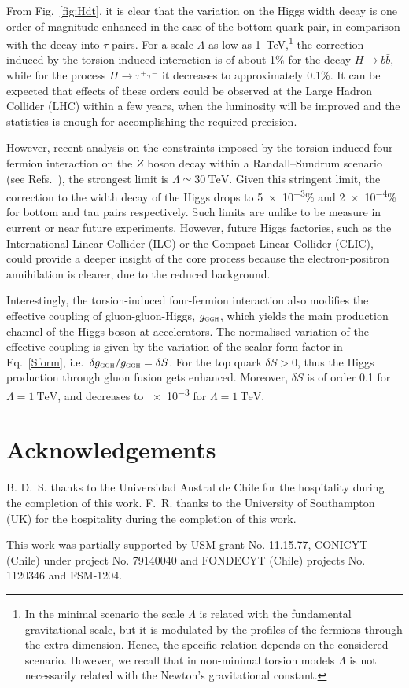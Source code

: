 \documentclass{ws-mpla}
\renewcommand{\(}{\left(}
\renewcommand{\)}{\right)}
\renewcommand{\[}{\left[}
\renewcommand{\]}{\right]}
\begin{document}
From Fig.~\ref{fig:Hdt}, it is clear that the variation on the Higgs width decay is one order of magnitude enhanced in the case of the bottom quark pair, in comparison with the decay into $\tau$ pairs. For a scale $\Lambda$ as low as \SI{1}{\TeV},\footnote{In the minimal scenario the scale $\Lambda$ is related with the fundamental gravitational scale, but it is modulated by the profiles of the fermions through the extra dimension. Hence, the specific relation depends on the considered scenario. However, we recall that in non-minimal torsion models $\Lambda$ is not necessarily related with the Newton's gravitational constant.} the correction induced by the torsion-induced interaction is of about \num{1}\% for the decay $H \to b \bar{b}$, while for the process $H \to \tau^+ \tau^-$ it decreases to approximately \num{.1}\%. It can be expected that effects of these orders could be observed at the Large Hadron Collider (LHC) within a few years, when the luminosity will be improved and the statistics is enough for accomplishing the required precision.

However, recent analysis on the constraints imposed by the torsion induced four-fermion interaction on the $Z$ boson decay within a Randall--Sundrum scenario (see Refs.~), the strongest limit is $\Lambda \simeq \SI{30}{\TeV}$. Given this stringent limit, the correction to the width decay of the Higgs drops to \num[exponent-product = \cdot]{5e-3}\% and \num[exponent-product = \cdot]{2e-4}\% for bottom and tau pairs respectively. Such limits are unlike to be measure in current or near future experiments. However, future Higgs factories, such as the International Linear Collider (ILC) or the Compact Linear Collider (CLIC), could provide a deeper insight of the core process because the electron-positron annihilation is clearer, due to the reduced background.

Interestingly, the torsion-induced four-fermion interaction also modifies the effective coupling of gluon-gluon-Higgs, $g_{\textsc{ggh}}$, which yields the main production channel of the Higgs boson at accelerators. The normalised variation of the effective coupling is given by the variation of the scalar form factor in Eq.~\eqref{Sform}, i.e.~$\delta g_{\textsc{ggh}} / g_{\textsc{ggh}} = \delta S$. For the top quark $\delta S > 0$, thus the Higgs production through gluon fusion gets enhanced. Moreover, $\delta S$ is of order \num{.1} for $\Lambda = \SI{1}{\TeV}$, and decreases to \num{e-3} for $\Lambda = \SI{1}{\TeV}$.

\section*{Acknowledgements}

B. D.~S. thanks to the Universidad Austral de Chile for the hospitality during the completion of this work. F.~R. thanks to the University of Southampton (UK) for the hospitality during the completion of this work.

This work was partially supported by USM grant No. 11.15.77, CONICYT (Chile) under project No. 79140040 and FONDECYT (Chile) projects No. 1120346 and FSM-1204.




\end{document}
